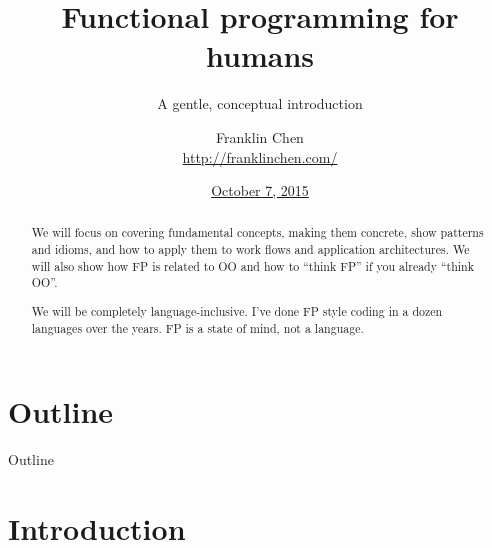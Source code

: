 {
}

\usepackage[utf8]{inputenc}
\usepackage{booktabs}

\usepackage{minted}

\title[Functional programming for humans]{Functional programming for humans}
\subtitle{A gentle, conceptual introduction}
\author{Franklin Chen \\ \url{http://franklinchen.com/}}
\date[October 7,
2015]{\href{http://www.meetup.com/Pittsburgh-Functional-Programming-Meetup/events/224593883/}{October
    7, 2015}}

\subject{Talks}




\maketitle

\begin{abstract}
  We will focus on covering fundamental concepts, making them
  concrete, show patterns and idioms, and how to apply them to work
  flows and application architectures. We will also show how FP is
  related to OO and how to ``think FP'' if you already ``think OO''.

  We will be completely language-inclusive. I've done FP style coding
  in a dozen languages over the years. FP is a state of mind, not a
  language.
\end{abstract}

\begin{frame}
  \titlepage{}
\end{frame}

\section*{Outline}

\begin{frame}{Outline}
  \tableofcontents[subsectionstyle=hide]
\end{frame}

\section{Introduction}

